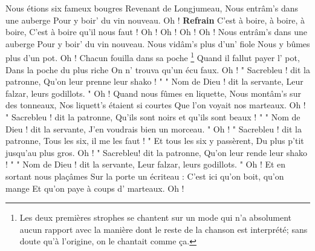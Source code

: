  \footenotemark 
[ititle={Marteaux, Les}]

\beginverse
Nous étions six fameux bougres
Revenant de Longjumeau,
Nous entrâm's dans une auberge
Pour y boir' du vin nouveau. Oh !
\endverse
\beginchorus
\textbf{Refrain}
C'est à boire, à boire, à boire,
C'est à boire qu'il nous faut !
Oh ! Oh ! Oh ! Oh !
\endchorus
\beginverse
Nous entrâm's dans une auberge
Pour y boir' du vin nouveau.
Nous vidâm's plus d'un' fiole
Nous y bûmes plus d'un pot. Oh !
\endverse
\beginverse
Chacun fouilla dans sa poche \footnote {Les deux premières strophes se chantent sur un mode qui n'a absolument aucun rapport avec la manière dont le reste de la chanson est interprété; sans doute qu'à l'origine, on le chantait comme ça.}
Quand il fallut payer l' pot,
Dans la poche du plus riche
On n' trouva qu'un écu faux. Oh !
\endverse
\beginverse
" Sacrebleu ! dit la patronne,
Qu'on leur prenne leur shako ! "
" Nom de Dieu ! dit la servante,
Leur falzar, leurs godillots. " Oh !
\endverse
\beginverse
Quand nous fûmes en liquette,
Nous montâm's sur des tonneaux,
Nos liquett's étaient si courtes
Que l'on voyait nos marteaux. Oh !
\endverse
\beginverse
" Sacrebleu ! dit la patronne,
Qu'ils sont noirs et qu'ils sont beaux ! "
" Nom de Dieu ! dit la servante,
J'en voudrais bien un morceau. " Oh !
\endverse
\beginverse
" Sacrebleu ! dit la patronne,
Tous les six, il me les faut ! "
Et tous les six y passèrent,
Du plus p'tit jusqu'au plus gros. Oh !
\endverse
\beginverse
" Sacrebleu! dit la patronne,
Qu'on leur rende leur shako ! "
" Nom de Dieu ! dit la servante,
Leur falzar, leurs godillots. " Oh !
\endverse
\beginverse
Et en sortant nous plaçâmes
Sur la porte un écriteau :
C'est ici qu'on boit, qu'on mange
Et qu'on paye à coups d' marteaux. Oh !
\endverse
\endsong
